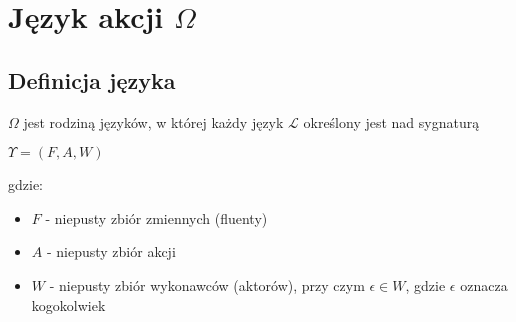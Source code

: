 \documentclass{article}
\begin{document}
\section{Język akcji $\Omega$}

\subsection{Definicja języka}
$\Omega$ jest rodziną języków, w której każdy język $\mathcal{L}$ określony jest nad sygnaturą 
\begin{center}
$\Upsilon=(F,A,W)$
\end{center}
gdzie: 
\begin{itemize}
\item $F$ - niepusty zbiór zmiennych (fluenty)
\item $A$ - niepusty zbiór akcji
\item $W$ - niepusty zbiór wykonawców (aktorów), przy czym $\epsilon\in W$, gdzie $\epsilon$ oznacza kogokolwiek
\end{itemize}
\end{document}
